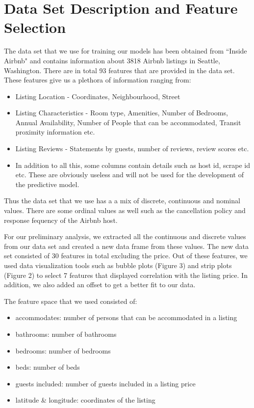 \documentclass[12pt]{article}
\begin{document}
\section*{Data Set Description and Feature Selection}
The data set that we use for training our models has been obtained from ``Inside Airbnb" and contains information about 3818 Airbnb listings in Seattle, Washington. There are in total 93 features that are provided in the data set. These features give us a plethora of information ranging from:

\begin{itemize}
\item Listing Location - Coordinates, Neighbourhood, Street
\item Listing Characteristics - Room type, Amenities, Number of Bedrooms, Annual Availability, Number of People that can be accommodated, Transit proximity information etc.
\item Listing Reviews - Statements by guests, number of reviews, review scores etc.
\item In addition to all this, some columns contain details such as host id, scrape id etc. These are obviously useless and will not be used for the development of the predictive model.
\end{itemize}

\noindent Thus the data set that we use has a a mix of discrete, continuous and nominal values. There are some ordinal values as well such as the cancellation policy and response fequency of the Airbnb host.


\noindent For our preliminary analysis, we extracted all the continuous and discrete values from our data set and created a new data frame from these values. The new data set consisted of 30 features in total excluding the price. Out of these features, we used data visualization tools such as bubble plots (Figure 3) and strip plots (Figure 2) to select 7 features that displayed correlation with the listing price. In addition, we also added an offset to get a better fit to our data.

\noindent The feature space that we used consisted of:
\begin{itemize}
\item accommodates: number of persons that can be accommodated in a listing
\item bathrooms: number of bathrooms
\item bedrooms: number of bedrooms
\item beds: number of beds
\item guests included: number of guests included in a listing price
\item latitude \& longitude: coordinates of the listing
\end{itemize}
\end{document}
